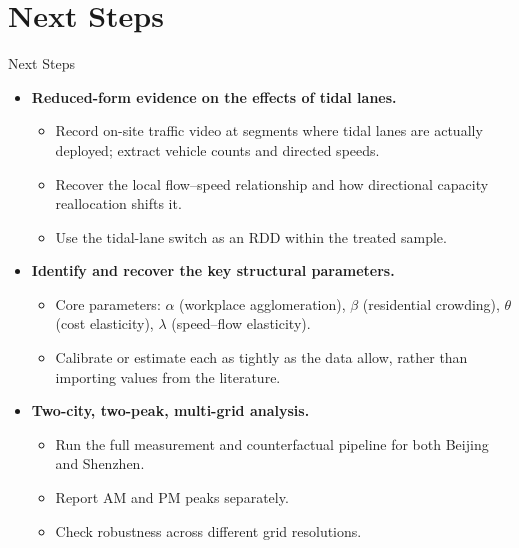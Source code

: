\documentclass[11pt,aspectratio=169]{beamer}
\newcommand{\good}[1]{\textcolor{blue!70!black}{#1}}
\newcommand{\app}[1]{\allowbreak\hspace{0.25em}\hyperlink{#1}{\beamergotobutton{details}}}
\begin{document}
\section{Next Steps}
\begin{frame}[label=nextsteps]{Next Steps}
\small
\begin{itemize}
  \item \textbf{Reduced-form evidence on the effects of tidal lanes.}
  \begin{itemize}\footnotesize
    \item Record on-site traffic video at segments where tidal lanes are actually deployed; extract vehicle counts and directed speeds. \app{appvideofacts}
    \item Recover the local flow--speed relationship and how directional capacity reallocation shifts it.
    \item Use the tidal-lane switch as an RDD within the treated sample. \app{appvideordit}
  \end{itemize}
  \item \textbf{Identify and recover the key structural parameters.}
  \begin{itemize}\footnotesize
    \item Core parameters: $\alpha$ (workplace agglomeration), $\beta$ (residential crowding), $\theta$ (cost elasticity), $\lambda$ (speed--flow elasticity).
    \item Calibrate or estimate each as tightly as the data allow, rather than importing values from the literature.
  \end{itemize}
  \item \textbf{Two-city, two-peak, multi-grid analysis.}
  \begin{itemize}\footnotesize
    \item Run the full measurement and counterfactual pipeline for both \good{Beijing} and \good{Shenzhen}.
    \item Report \good{AM} and \good{PM} peaks separately.
    \item Check robustness across different grid resolutions.
  \end{itemize}
\end{itemize}
\end{frame}

\appendix
\end{document}

